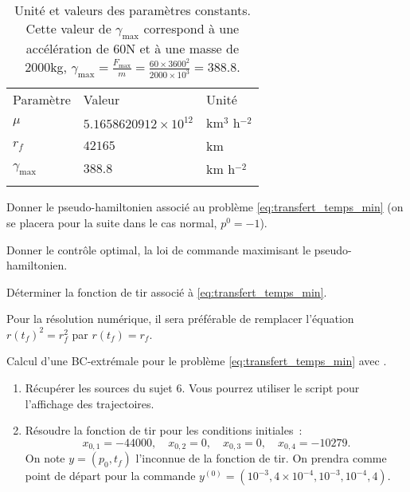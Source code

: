 \begin{table}[ht!]
    \centering
    \begin{tabular}{lll}
        \medhrule
        Param\`etre                                & Valeur & Unit\'e   \\
        \bighrule
        $\mu$                   & $5.1658620912\times10^{12}$  & km$^3$ h$^{-2}$ \\
        $r_f$                   & $42165$                           & km \\
        $\gamma_\mathrm{max}$   & $388.8$                           & km h$^{-2}$ \\
        \medhrule
        \\
    \end{tabular}
    \caption{Unit\'e et valeurs des param\`etres constants. Cette valeur de $\gamma_\mathrm{max}$ correspond \`a une acc\'el\'eration de 60N et \`a
    une masse de 2000kg, \cf $\gamma_\mathrm{max} = \frac{F_\mathrm{max}}{m} = \frac{60 \times 3600^2}{2000 \times 10^3} = 388.8$.}
    \label{table:transfert_temps_min_data}
\end{table}

\begin{myQuestion}
    \label{question:transfert_hamiltonien}
    Donner le pseudo-hamiltonien associ\'e au probl\`eme \eqref{eq:transfert_temps_min} (on se placera pour la suite dans le cas normal, \ie $p^0=-1$).
\end{myQuestion}

\begin{myQuestion}
    \label{question:transfert_control}
    Donner le contr\^ole optimal, \ie la loi de commande maximisant le pseudo-hamiltonien.
\end{myQuestion}

\begin{myQuestion}
    \label{question:transfert_fonction_de_tir}
    D\'eterminer la fonction de tir associ\'e \`a \eqref{eq:transfert_temps_min}.
\end{myQuestion}

\begin{myremark}
    Pour la r\'esolution num\'erique, il sera pr\'ef\'erable de remplacer l'\'equation $r(t_f)^2 = r_f^2$ par $r(t_f) = r_f$.
\end{myremark}

\begin{myExercice} Calcul d'une BC-extr\'emale pour le probl\`eme \eqref{eq:transfert_temps_min} avec \hampath.
    \begin{enumerate}
        \item R\'ecup\'erer les sources du sujet 6. Vous pourrez utiliser le script  pour l'affichage des trajectoires.
        \item R\'esoudre la fonction de tir pour les conditions initiales~:
            \[
                x_{0,1} = -44000, \quad x_{0,2} = 0, \quad x_{0,3} = 0, \quad x_{0,4} = -10279.
            \]
            On note $y=(p_0,t_f)$ l'inconnue de la fonction de tir. On prendra comme point de d\'epart pour la commande 
            $y^{(0)} = (10^{-3}, 4\times 10^{-4}, 10^{-3}, 10^{-4}, 4)$.
    \end{enumerate}
\end{myExercice}


